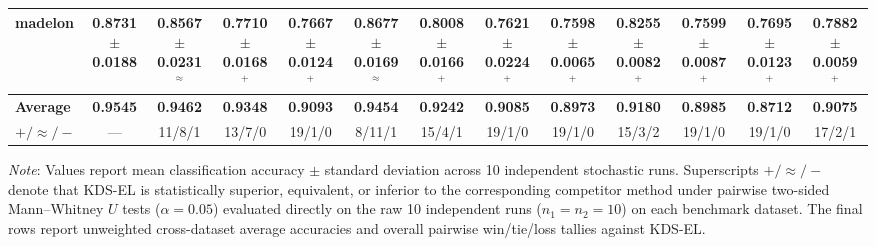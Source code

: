 \begin{table}
{\begin{tabular}{l *{12}{c}}
madelon & 0.8731$\pm$0.0188 & 0.8567$\pm$0.0231 $^{\approx}$ & 0.7710$\pm$0.0168 $^{+}$ & 0.7667$\pm$0.0124 $^{+}$ & 0.8677$\pm$0.0169 $^{\approx}$ & 0.8008$\pm$0.0166 $^{+}$ & 0.7621$\pm$0.0224 $^{+}$ & 0.7598$\pm$0.0065 $^{+}$ & 0.8255$\pm$0.0082 $^{+}$ & 0.7599$\pm$0.0087 $^{+}$ & 0.7695$\pm$0.0123 $^{+}$ & 0.7882$\pm$0.0059 $^{+}$ \\
\midrule
\textbf{Average} & \textbf{0.9545} & \textbf{0.9462} & \textbf{0.9348} & \textbf{0.9093} & \textbf{0.9454} & \textbf{0.9242} & \textbf{0.9085} & \textbf{0.8973} & \textbf{0.9180} & \textbf{0.8985} & \textbf{0.8712} & \textbf{0.9075} \\
$+ / \approx / -$ & — & 11/8/1 & 13/7/0 & 19/1/0 & 8/11/1 & 15/4/1 & 19/1/0 & 19/1/0 & 15/3/2 & 19/1/0 & 19/1/0 & 17/2/1 \\
\bottomrule
\end{tabular}%
}
\vspace{3pt}
\par\raggedright\scriptsize
\textit{Note}: Values report mean classification accuracy $\pm$ standard deviation across 10 independent stochastic runs. Superscripts $+ / \approx / -$ denote that KDS-EL is statistically superior, equivalent, or inferior to the corresponding competitor method under pairwise two-sided Mann--Whitney $U$ tests ($\alpha = 0.05$) evaluated directly on the raw 10 independent runs ($n_1 = n_2 = 10$) on each benchmark dataset. The final rows report unweighted cross-dataset average accuracies and overall pairwise win/tie/loss tallies against KDS-EL.
\end{table}
